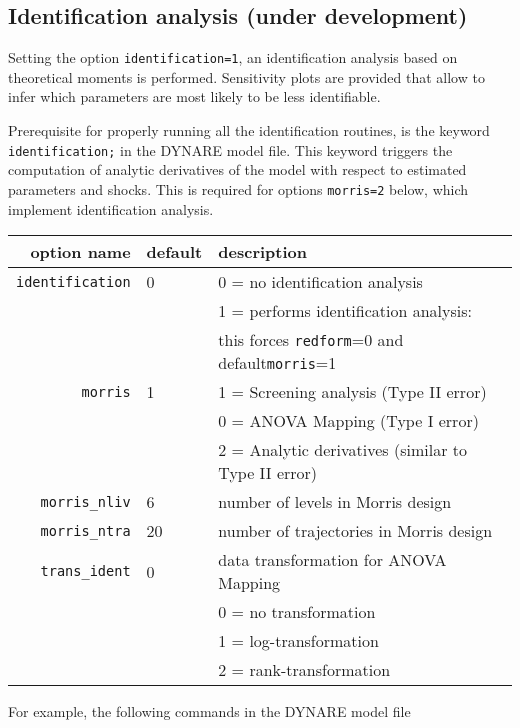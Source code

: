 \documentclass[12pt,a4paper]{article}
\begin{document}
\subsection{Identification analysis (under development)}
Setting the option \verb"identification=1", an identification
analysis based on theoretical moments is performed. Sensitivity plots are provided that
allow to infer which parameters are most likely to be less
identifiable.

Prerequisite for properly running all the identification routines, is the keyword
\verb"identification;" in the DYNARE model file. This keyword triggers the computation of analytic derivatives of the model with respect to estimated parameters and shocks. This is required for options \verb"morris=2" below, which implement \cite{Iskrev2009} identification analysis.
\vspace{1cm}


\begin{tabular}{r|l|l}
                option name & default & description  \\ \hline
       \verb"identification"& 0 & 0 = no identification analysis  \\
                            &   & 1 = performs identification analysis:\\
                            &   & this forces \verb"redform"=0 and default\verb"morris"=1\\
               \verb"morris"& 1 & 1 = Screening analysis (Type II error)\\
                            &   & 0 = ANOVA Mapping (Type I error)\\
                            &   & 2 = Analytic derivatives (similar to Type II error)\\
          \verb"morris_nliv"& 6 & number of levels in Morris design\\
          \verb"morris_ntra"& 20& number of trajectories in Morris design\\
          \verb"trans_ident"& 0 & data transformation for ANOVA Mapping\\
                            &   & 0 = no transformation\\
                            &   & 1 = log-transformation\\
                            &   & 2 = rank-transformation\\\hline
\end{tabular}

\vspace{1cm}
\noindent For example, the following commands in the DYNARE model file
\end{document}

